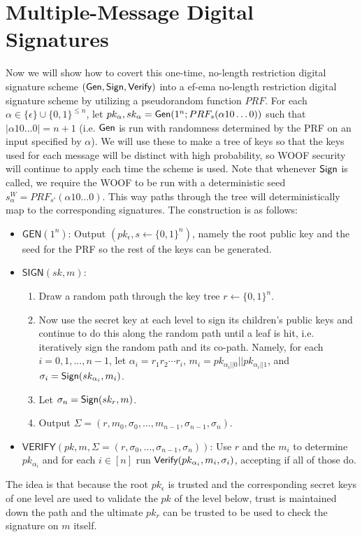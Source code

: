 \section{Multiple-Message Digital Signatures} 

Now we will show how to covert this one-time, no-length restriction digital signature scheme $(\mathsf{Gen}, \mathsf{Sign}, \mathsf{Verify})$ into a ef-ema no-length restriction digital signature scheme by utilizing a pseudorandom function $PRF$. 
For each $\alpha \in \{\epsilon\} \cup \{0,1\}^{\leq n}$, let $pk_\alpha, sk_\alpha = \mathsf{Gen}(1^n; PRF_s(\alpha 10 \ldots 0))$ such that $|\alpha 10 \ldots 0| = n+1$ (i.e. $\mathsf{Gen}$ is run with randomness determined by the PRF on an input specified by $\alpha$). 
We will use these to make a tree of keys so that the keys used for each message will be distinct with high probability, so WOOF security will continue to apply each time the scheme is used. 
Note that whenever $\mathsf{Sign}$ is called, we require the WOOF to be run with a deterministic seed $s_{\alpha}^W = PRF_{s'}(\alpha 10 \ldots 0)$. 
This way paths through the tree will deterministically map to the corresponding signatures. 
The construction is as follows: 
\begin{itemize}
    \item $\mathsf{GEN}(1^n)$: Output $(pk_\epsilon, s \leftarrow \{0,1\}^n)$, namely the root public key and the seed for the PRF so the rest of the keys can be generated. 

    \item $\mathsf{SIGN}(sk, m)$: 
    \begin{enumerate}
        \item Draw a random path through the key tree $r \leftarrow \{0,1\}^n$. 

        \item Now use the secret key at each level to sign its children's public keys and continue to do this along the random path until a leaf is hit, i.e. iteratively sign the random path and its co-path. 
        Namely, for each $i = 0, 1, \ldots, n-1$, let $\alpha_i = r_1 r_2 \cdots r_i$, $m_i = pk_{\alpha_i || 0} || pk_{\alpha_i || 1}$, and $\sigma_i = \mathsf{Sign}(sk_{\alpha_i}, m_i)$. 

        \item Let $\sigma_n = \mathsf{Sign}(sk_r, m)$. 

        \item Output $\Sigma = (r, m_0, \sigma_0, \ldots, m_{n-1}, \sigma_{n-1}, \sigma_n)$. 
    \end{enumerate} 

    \item $\mathsf{VERIFY}(pk, m, \Sigma = (r, \sigma_0, \ldots, \sigma_{n-1}, \sigma_n))$: Use $r$ and the $m_i$ to determine $pk_{\alpha_i}$ and for each $i \in [n]$ run $\mathsf{Verify}(pk_{\alpha_i}, m_i, \sigma_i)$, accepting if all of those do. 
\end{itemize}
The idea is that because the root $pk_{\epsilon}$ is trusted and the corresponding secret keys of one level are used to validate the $pk$ of the level below, trust is maintained down the path and the ultimate $pk_r$ can be trusted to be used to check the signature on $m$ itself. 

